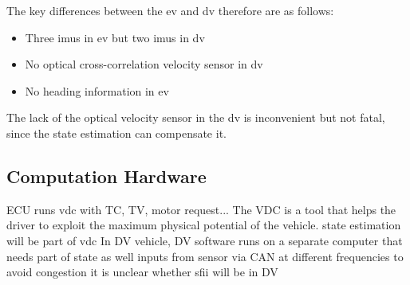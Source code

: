 The key differences between the \gls{ev} and \gls{dv} therefore are as follows:
\begin{itemize}
\item Three \glspl{imu} in \gls{ev} but two \glspl{imu} in \gls{dv}
\item No optical cross-correlation velocity sensor in \gls{dv}
\item No heading information in \gls{ev}
\end{itemize}
The lack of the optical velocity sensor in the \gls{dv} is inconvenient but not fatal, since the state estimation can compensate it.


\subsection{Computation Hardware}
ECU runs \gls{vdc} with TC, TV, motor request...
The VDC is a tool that helps the driver to exploit the maximum physical potential of the vehicle.
state estimation will be part of \gls{vdc}
In DV vehicle, DV software runs on a separate computer that needs part of state as well
inputs from sensor via CAN at different frequencies to avoid congestion
it is unclear whether sfii will be in DV